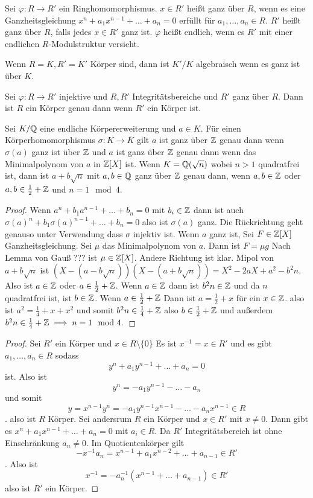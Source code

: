 \begin{Def}
    Sei \(\varphi\colon R\to R'\) ein Ringhomomorphismus. \(x\in R'\) heißt ganz über \(R\), wenn es eine Ganzheitsgleichung \(x^n+a_1x^{n-1}+\dots+a_n=0\) erfüllt für \(a_1,\dots,a_n\in R\).
    \(R'\) heißt ganz über \(R\), falls jedes \(x\in R'\) ganz ist. \(\varphi\) heißt endlich, wenn es \(R'\) mit einer endlichen \(R\)-Modulstruktur versieht.
\end{Def}
\begin{Bsp}
    Wenn \(R=K, R'=K'\) Körper sind, dann ist \(K'/K\) algebraisch wenn es ganz ist über \(K\).
\end{Bsp}
\begin{Lemma}\label{Lem:GanzheitKörper}
    Sei \(\varphi\colon R\to R'\) injektive und \(R,R'\) Integritätsbereiche und \(R'\) ganz über \(R\). Dann ist \(R\) ein Körper genau dann wenn \(R'\) ein Körper ist. 
\end{Lemma}
\begin{Bsp}
     Sei \(K/\mathbb{Q}\) eine endliche Körpererweiterung und \(a\in K\). Für einen Körperhomomorphismus \(\sigma\colon K\to\bar K\) gilt \(a\) ist ganz über \(\mathbb{Z}\) genau dann wenn \(\sigma(a)\) ganz ist über \(\mathbb{Z}\) und \(a\) ist ganz über \(\mathbb{Z}\) genau dann wenn das Minimalpolynom von \(a\) in \(\mathbb{Z}[X]\) ist. Wenn \(K=\mathbb{Q}(\sqrt{n})\) wobei \(n>1\) quadratfrei ist, dann ist \(a+b\sqrt{n}\) mit \(a,b\in \mathbb{Q}\) ganz über \(\mathbb{Z}\) genau dann, wenn \(a,b\in\mathbb{Z}\) oder \(a,b\in\frac 1 2+\mathbb{Z}\) und \(n=1\mod 4\).
\end{Bsp}
\begin{proof}
    Wenn \(a^n+b_1a^{n-1}+\dots+b_n=0\) mit \(b_i\in\mathbb{Z}\) dann ist auch \(\sigma(a)^n+b_1\sigma(a)^{n-1}+\dots+b_n=0\) also ist \(\sigma(a)\) ganz. Die Rückrichtung geht genauso unter Verwendung dass \(\sigma\) injektiv ist.
    Wenn \(a\) ganz ist, Sei \(F\in \mathbb{Z}[X]\) Ganzheitsgleichung. Sei \(\mu\) das Minimalpolynom von \(a\). Dann ist \(F=\mu g\)
    Nach Lemma von Gauß ??? ist \(\mu\in\mathbb{Z}[X]\).
    Andere Richtung ist klar.
    Mipol von \(a+b\sqrt{n}\) ist \((X-(a-b\sqrt{n}))(X-(a+b\sqrt n))=X^2-2aX+a^2-b^2n\).
    Also ist \(a\in \mathbb{Z}\) oder \(a\in  \frac 1 2+\mathbb{Z}\).
    Wenn \(a\in\mathbb{Z}\) dann ist \(b^2n\in\mathbb{Z}\) und da \(n\) quadratfrei ist, ist \(b\in\mathbb{Z}\). 
    Wenn \(a\in \frac 1 2+\mathbb{Z}\) Dann ist \(a=\frac 1 2+x\) für ein \(x\in\mathbb{Z}\).
    also ist \(a^2=\frac 1 4+x+x^2\) und somit \(b^2n\in \frac 1 4+\mathbb{Z}\) also \(b\in \frac 1 2+\mathbb{Z}\) und außerdem \(b^2n\in \frac 1 4+\mathbb{Z}\implies n=1\mod 4.\)
\end{proof}
\begin{proof}
    Sei \(R'\) ein Körper und \(x\in R\setminus\{0\}\) Es ist \(x^{-1}=x\in R'\) und es gibt \(a_1,\dots,a_n\in R\) sodass \[y^n+a_1y^{n-1}+\dots+a_n=0\] ist. Also ist 
    \[y^n=-a_1y^{n-1}-\dots-a_n\] und somit \[y=x^{n-1}y^n=-a_1y^{n-1}x^{n-1}-\dots -a_nx^{n-1}\in R\].
    also ist \(R\) Körper.
    Sei andersrum \(R\) ein Körper und \(x\in R'\) mit \(x\neq 0\).
    Dann gibt es \(x^n+a_1x^{n-1}+\dots+a_n=0\) mit \(a_i\in R\).
    Da \(R'\) Integritätsbereich ist ohne Einschränkung \(a_n\neq 0\).
    Im Quotientenkörper gilt \[-x^{-1}a_n=x^{n-1}+a_1x^{n-2}+\dots+a_{n-1}\in R'\]. Also ist \[x^{-1}=-a_n^{-1}(x^{n-1}+\dots +a_{n-1})\in R'\] also ist \(R'\) ein Körper.
\end{proof}
